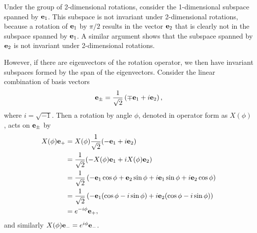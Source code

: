 \begin{example}
    Under the group of 2-dimensional rotations, consider the 1-dimensional subspace spanned by $\mathbf{e}_1$. This subspace is not invariant under 2-dimensional rotations, because a rotation of $\mathbf{e}_1$ by $\pi/2$ results in the vector $\mathbf{e}_2$ that is clearly not in the subspace spanned by $\mathbf{e}_1$. A similar argument shows that the subspace spanned by $\mathbf{e}_2$ is not invariant under 2-dimensional rotations.

    However, if there are eigenvectors of the rotation operator, we then have invariant subspaces formed by the span of the eigenvectors.
    Consider the linear combination of basis vectors
    \begin{equation*}
        \mathbf{e}_\pm = \frac{1}{\sqrt{2}}\left( \mp\mathbf{e}_1 + i\mathbf{e}_2 \right),
    \end{equation*}
    where $i = \sqrt{-1}$. Then a rotation by angle $\phi$, denoted in operator form as $X(\phi)$, acts on $\mathbf{e}_\pm$ by
    \begin{align*}
        X(\phi)\mathbf{e}_+ &= X(\phi)\frac{1}{\sqrt{2}}(-\mathbf{e}_1 + i\mathbf{e}_2) \\
        &= \frac{1}{\sqrt{2}}(-X(\phi)\mathbf{e}_1 + iX(\phi)\mathbf{e}_2) \\
        &= \frac{1}{\sqrt{2}}\left( -\mathbf{e}_1\cos\phi + \mathbf{e}_2\sin\phi +i\mathbf{e}_1\sin\phi + i\mathbf{e}_2\cos\phi \right) \\
        &= \frac{1}{\sqrt{2}}\left( -\mathbf{e}_1(\cos\phi - i\sin\phi) + i\mathbf{e}_2(\cos\phi-i\sin\phi) \right) \\
        &= e^{-i\phi}\mathbf{e}_+,
    \end{align*}
    and similarly $X(\phi)\mathbf{e}_- = e^{i\phi}\mathbf{e}_-$.


\end{example}
